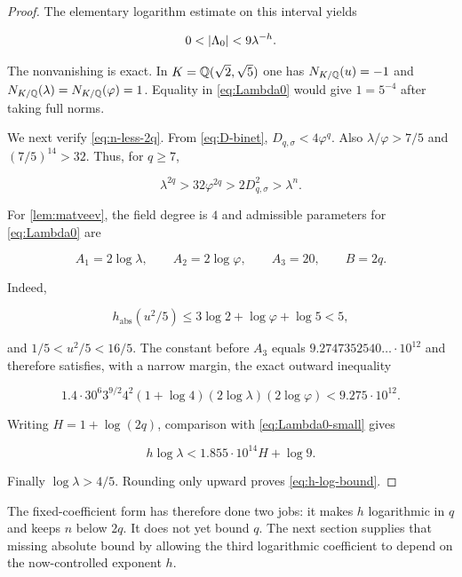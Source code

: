 \begin{proof}
The elementary logarithm estimate on this interval yields

\begin{equation}
 0<\lvert\Lambda_0\rvert<9\lambda^{-h}.
 \label{eq:Lambda0-small}
\end{equation}

The nonvanishing is exact. In
$K=\mathbb{Q}(\sqrt2,\sqrt5)$ one has
$N_{K/\mathbb{Q}}(u)=-1$ and
$N_{K/\mathbb{Q}}(\lambda)=N_{K/\mathbb{Q}}(\varphi)=1$. Equality in
\cref{eq:Lambda0} would give $1=5^{-4}$ after taking full norms.

We next verify \cref{eq:n-less-2q}. From \cref{eq:D-binet},
$D_{q,\sigma}<4\varphi^q$. Also $\lambda/\varphi>7/5$ and
$(7/5)^{14}>32$. Thus, for $q\geqslant7$,

\begin{equation}
 \lambda^{2q}>32\varphi^{2q}>2D_{q,\sigma}^2>\lambda^n.
\end{equation}

For \cref{lem:matveev}, the field degree is $4$ and admissible parameters
for \cref{eq:Lambda0} are

\begin{equation}
 A_1=2\log\lambda,
 \qquad
 A_2=2\log\varphi,
 \qquad
 A_3=20,
 \qquad
 B=2q.
\end{equation}

Indeed,

\begin{equation}
 h_{\mathrm{abs}}(u^2/5)
 \leqslant3\log2+\log\varphi+\log5<5,
\end{equation}

and $1/5<u^2/5<16/5$. The constant before $A_3$ equals
$9.2747352540\ldots\mathbin{\cdot}10^{12}$ and therefore satisfies, with a
narrow margin, the exact outward inequality

\begin{equation}
 1.4\mathbin{\cdot}30^6 3^{9/2}4^2(1+\log4)
 (2\log\lambda)(2\log\varphi)
 <9.275\mathbin{\cdot}10^{12}.
 \label{eq:matveev-prefactor}
\end{equation}

Writing $H=1+\log(2q)$, comparison with
\cref{eq:Lambda0-small} gives

\begin{equation}
 h\log\lambda<1.855\mathbin{\cdot}10^{14}H+\log9.
\end{equation}

Finally $\log\lambda>4/5$. Rounding only upward proves
\cref{eq:h-log-bound}.
\end{proof}

The fixed-coefficient form has therefore done two jobs: it makes $h$
logarithmic in $q$ and keeps $n$ below $2q$. It does not yet bound $q$.
The next section supplies that missing absolute bound by allowing the third
logarithmic coefficient to depend on the now-controlled exponent $h$.
